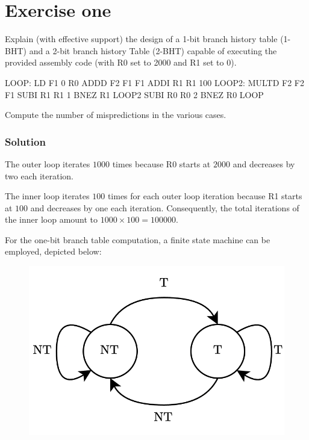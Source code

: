 \section{Exercise one}

Explain (with effective support) the design of a 1-bit branch history table (1-BHT) and a 2-bit branch history Table (2-BHT) capable of executing the provided assembly code (with R0 set to 2000 and R1 set to 0).
\begin{verbnobox}[\verbarg]
LOOP:   LD F1 0 R0
        ADDD F2 F1 F1
        ADDI R1 R1 100
LOOP2:  MULTD F2 F2 F1
        SUBI R1 R1 1
        BNEZ R1 LOOP2
        SUBI R0 R0 2
        BNEZ R0 LOOP
\end{verbnobox}
Compute the number of mispredictions in the various cases. 

\subsubsection*{Solution}
The outer loop iterates $1000$ times because R0 starts at $2000$ and decreases by two each iteration.

The inner loop iterates $100$ times for each outer loop iteration because R1 starts at $100$ and decreases by one each iteration. 
Consequently, the total iterations of the inner loop amount to $1000 \times 100 = 100000$.

For the one-bit branch table computation, a finite state machine can be employed, depicted below:
\begin{figure}[H]
    \centering
    \includegraphics[width=0.4\linewidth]{images/1bht.png}
\end{figure}

